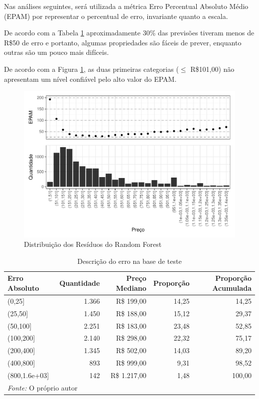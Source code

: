 \documentclass[
	12pt,				%
	a4paper,		%
	oneside,    %
	chapter=TITLE,		   %
	section=TITLE,		   %
	subsection=TITLE,	   %
	subsubsection=TITLE, %
	english,			%
	french,				%
	spanish,			%
	brazil,				%
]{abntex2}
\begin{document}
Nas análises seguintes, será utilizada a métrica Erro Percentual
Absoluto Médio (EPAM) por representar o percentual de erro, invariante
quanto a escala.

De acordo com a Tabela \ref{tab:erro_test} aproximadamente 30\% das
previsões tiveram menos de R\$50 de erro e portanto, algumas
propriedades são fáceis de prever, enquanto outras são um pouco mais
difíceis.

De acordo com a Figura \ref{graf_resid_rf}, as duas primeiras categorias
(\(\le\) R\$101,00) não apresentam um nível confiável pelo alto valor do
EPAM.

\begin{figure}
\centering
\includegraphics{00-TCC_files/figure-latex/graf_resid_rf-1.pdf}
\caption{\label{graf_resid_rf}Distribuição dos Resíduos do Random
Forest}
\end{figure}

\begin{table}

\caption{\label{tab:erro_test}Descrição do erro na base de teste}
\centering
\begin{tabular}[t]{l|r|r|r|r}
\hline
Erro Absoluto & Quantidade & Preço Mediano & Proporção & Proporção Acumulada\\
\hline
(0,25] & 1.366 & R\$   199,00 & 14,25 & 14,25\\
\hline
(25,50] & 1.450 & R\$   188,00 & 15,12 & 29,37\\
\hline
(50,100] & 2.251 & R\$   183,00 & 23,48 & 52,85\\
\hline
(100,200] & 2.140 & R\$   298,00 & 22,32 & 75,17\\
\hline
(200,400] & 1.345 & R\$   502,00 & 14,03 & 89,20\\
\hline
(400,800] & 893 & R\$   999,00 & 9,31 & 98,52\\
\hline
(800,1.6e+03] & 142 & R\$ 1.217,00 & 1,48 & 100,00\\
\hline
\multicolumn{5}{l}{\textit{Fonte: } O próprio autor}\\
\end{tabular}
\end{table}
\end{document}
